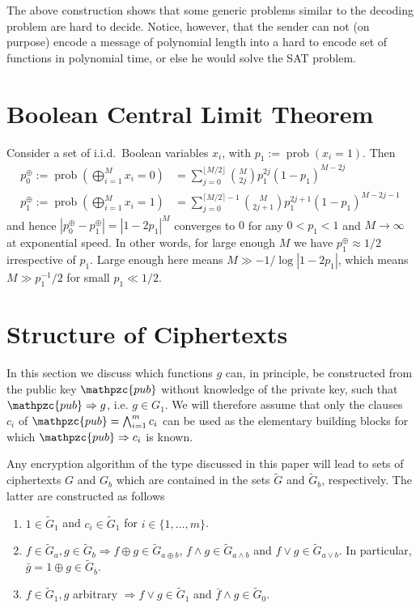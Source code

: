 \documentclass[final,journal,compsoc]{IEEEtran}
\newcommand{\pub}{\mathpzc{pub}}
\begin{document}
The above construction shows that some generic problems similar to the
decoding problem are hard to decide. Notice, however, that the sender
can not (on purpose) encode a message of polynomial length into a hard
to encode set of functions in polynomial time, or else he would solve
the SAT problem.


\section{Boolean Central Limit Theorem\label{sec:boolean-clt}}

Consider a set of i.i.d.\ Boolean variables $x_i$, with
$p_1:=\operatorname{prob}(x_i=1)$. Then
\begin{align}
p^\oplus_0:=\operatorname{prob}\left(\bigoplus_{i=1}^M x_i=0\right) &=
\sum_{j=0}^{\lfloor M/2 \rfloor} \binom{M}{2j}p_1^{2j}(1-p_1)^{M-2j}
\\
p^\oplus_1
:=\operatorname{prob}\left(\bigoplus_{i=1}^M x_i=1\right) &=
\sum_{j=0}^{\lceil M/2 \rceil-1} \binom{M}{2j+1}p_1^{2j+1}(1-p_1)^{M-2j-1}
\end{align}
and hence $|p^\oplus_0 - p^\oplus_1| = |1-2p_1|^M$ converges to $0$
for any $0<p_1<1$ and $M\to\infty$ at exponential speed. In other
words, for large enough $M$ we have $p^\oplus_1 \approx 1/2$
irrespective of $p_1$. Large enough here means $M \gg -1/\log
|1-2p_1|$, which means $M \gg p_1^{-1}/2$ for small $p_1 \ll 1/2$.




\section{Structure of Ciphertexts\label{sec:structure-ciphers}}

In this section we discuss which functions $g$ can, in principle, be constructed from
the public key $\pub$  without knowledge of the
private key, such that $\pub \Rightarrow g$, i.e. $g\in G_1$. We
will therefore assume that only the clauses $c_i$ of $\pub =
\bigwedge_{i=1}^m c_i$ can be used as the elementary building blocks
for which $\pub \Rightarrow c_i$ is known.

Any encryption algorithm of the type discussed in this paper will lead
to sets of ciphertexts $G$ and $G_b$ which are contained in the sets
$\tilde G$ and $\tilde G_b$, respectively. The latter are constructed
as follows
\begin{enumerate}
\item\label{item:8} $1 \in \tilde G_1$ and $c_i \in \tilde G_1$ for $i\in\{1,\ldots,m\}$.
\item\label{item:9} $f\in \tilde G_a, g\in \tilde G_b \Rightarrow f \oplus g \in
  \tilde G_{a\oplus b}$, $f \wedge g \in \tilde G_{a\wedge b}$ and $f \vee g \in
  \tilde G_{a\vee b}$. In
  particular, $\bar g = 1 \oplus g \in \tilde G_{\bar b}$.
\item\label{item:10} $f\in \tilde G_1, g$ arbitrary $\Rightarrow f\vee g
  \in \tilde G_1$ and $\bar f \wedge g \in \tilde G_0$.
\end{enumerate}
\end{document}
